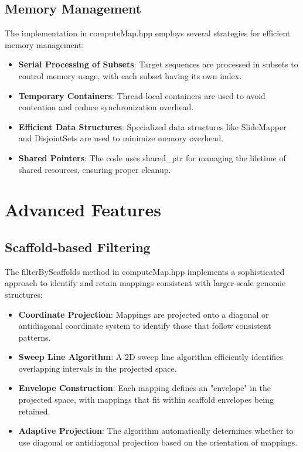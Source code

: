 \documentclass{article}
\begin{document}
\subsection{Memory Management}

The implementation in computeMap.hpp employs several strategies for efficient memory management:

\begin{itemize}
    \item \textbf{Serial Processing of Subsets}: Target sequences are processed in subsets to control memory usage, with each subset having its own index.
    
    \item \textbf{Temporary Containers}: Thread-local containers are used to avoid contention and reduce synchronization overhead.
    
    \item \textbf{Efficient Data Structures}: Specialized data structures like SlideMapper and DisjointSets are used to minimize memory overhead.
    
    \item \textbf{Shared Pointers}: The code uses shared\_ptr for managing the lifetime of shared resources, ensuring proper cleanup.
\end{itemize}

\section{Advanced Features}

\subsection{Scaffold-based Filtering}

The filterByScaffolds method in computeMap.hpp implements a sophisticated approach to identify and retain mappings consistent with larger-scale genomic structures:

\begin{itemize}
    \item \textbf{Coordinate Projection}: Mappings are projected onto a diagonal or antidiagonal coordinate system to identify those that follow consistent patterns.
    
    \item \textbf{Sweep Line Algorithm}: A 2D sweep line algorithm efficiently identifies overlapping intervals in the projected space.
    
    \item \textbf{Envelope Construction}: Each mapping defines an "envelope" in the projected space, with mappings that fit within scaffold envelopes being retained.
    
    \item \textbf{Adaptive Projection}: The algorithm automatically determines whether to use diagonal or antidiagonal projection based on the orientation of mappings.
\end{itemize}
\end{document}
